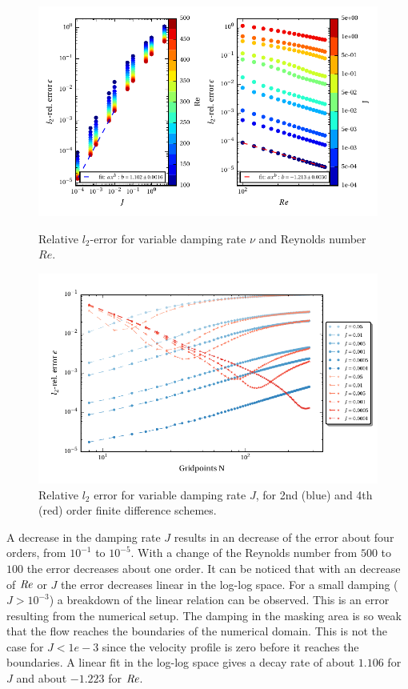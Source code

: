 \begin{figure}[!b]
  \centering
  \includegraphics{gfx/immersed_boundary/poiseuille_flow/2_vp/vp_error.pdf}  \caption{\label{fig:vp_error}
    Relative $l_2$-error for variable damping rate $\nu$ and Reynolds number $Re$.}
  \centering
  \includegraphics{gfx/immersed_boundary/poiseuille_flow/2_vp/vp_convergence.pdf}
  \caption{\label{fig:vp_conv}
      Relative $l_2$ error for variable damping rate $J$, for 2nd (blue) and 4th (red) order finite difference schemes.}
\end{figure}


A decrease in the damping rate $J$ results in an decrease of the error about four orders, from $10^{-1}$ to $10^{-5}$.
With a change of the Reynolds number from $500$ to $100$ the error decreases about one order.
It can be noticed that with an decrease of $\mbox{\textit{Re}}$ or $J$ the error decreases linear in the log-log space.
For a small damping ($J>10^{-3}$) a breakdown of the linear relation can be observed.
This is an error resulting from the numerical setup.
The damping in the masking area is so weak that the flow reaches the  boundaries of the numerical domain.
This is not the case for $J<1e-3$ since the velocity profile is zero before it reaches the boundaries.
A linear fit in the log-log space gives a  decay rate of about $1.106$ for  $J$ and about $-1.223$ for $\mbox{\textit{Re}}$.

